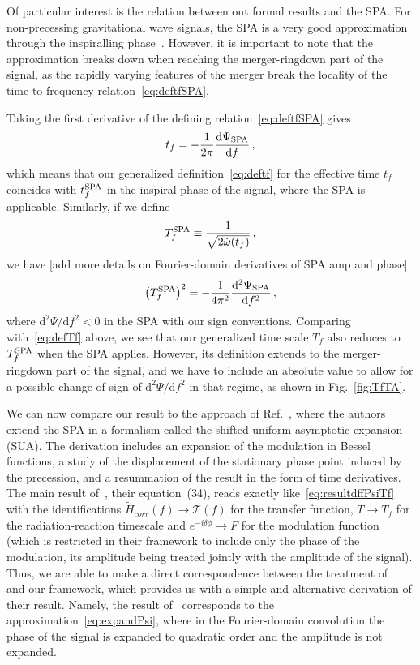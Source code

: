\documentclass[aps,showpacs,twocolumn,
prd,superscriptaddress,nofootinbib]{revtex4-1}
\newcommand{\be}{\begin{equation}}
\newcommand{\ee}{\end{equation}}
\newcommand\ud{{\mathrm{d}}}
\newcommand\calT{{\mathcal{T}}}
\newcommand{\Tf}{T_{f}}
\newcommand{\SM}[1]{{\color{Red} #1}}
\begin{document}
Of particular interest is the relation between out formal results and the SPA. For non-precessing gravitational wave signals, the SPA is a very good approximation through the inspiralling phase~\cite{Droz+99}. However, it is important to note that the approximation breaks down when reaching the merger-ringdown part of the signal, as the rapidly varying features of the merger break the locality of the time-to-frequency relation~\eqref{eq:deftfSPA}.  

Taking the first derivative of the defining relation~\eqref{eq:deftfSPA} gives
\be
	t_{f} = -\frac{1}{2\pi} \frac{\ud \Psi_{\rm SPA}}{\ud f} \,,
\ee
which means that our generalized definition~\eqref{eq:deftf} for the effective time $t_{f}$ coincides with $t_{f}^{\rm SPA}$ in the inspiral phase of the signal, where the SPA is applicable. Similarly, if we define
\be
	T_{f}^{\rm SPA} \equiv \frac{1}{\sqrt{2\dot{\omega}(t_{f})}} \,,
\ee
we have \SM{[add more details on Fourier-domain derivatives of SPA amp and phase]}
\be
	\left(T_{f}^{\rm SPA} \right)^{2} = -\frac{1}{4\pi^{2}}  \frac{\ud^{2} \Psi_{\rm SPA}}{\ud f^{2}} \,,
\ee
where $\ud^{2}\Psi/\ud f^{2} < 0$ in the SPA with our sign conventions. Comparing with~\eqref{eq:defTf} above, we see that our generalized time scale $\Tf$ also reduces to $T_{f}^{\rm SPA}$ when the SPA applies. However, its definition extends to the merger-ringdown part of the signal, and we have to include an absolute value to allow for a possible change of sign of $\ud^{2}\Psi/\ud f^{2}$ in that regime, as shown in Fig.~\ref{fig:TfTA}.

We can now compare our result to the approach of Ref.~\cite{KCY14}, where the authors extend the SPA in a formalism called the shifted uniform asymptotic expansion (SUA). The derivation includes an expansion of the modulation in Bessel functions, a study of the displacement of the stationary phase point induced by the precession, and a resummation of the result in the form of time derivatives. The main result of~\cite{KCY14}, their equation~(34), reads exactly like~\eqref{eq:resultdffPsiTf} with the identifications $\tilde{H}_{corr}(f)\rightarrow \calT(f)$ for the transfer function, $T\rightarrow \Tf$ for the radiation-reaction timescale and $e^{-i\delta\phi} \rightarrow F$ for the modulation function (which is restricted in their framework to include only the phase of the modulation, its amplitude being treated jointly with the amplitude of the signal). Thus, we are able to make a direct correspondence between the treatment of~\cite{KCY14} and our framework, which provides us with a simple and alternative derivation of their result. Namely, the result of~\cite{KCY14} corresponds to the approximation~\eqref{eq:expandPsi}, where in the Fourier-domain convolution the phase of the signal is expanded to quadratic order and the amplitude is not expanded.
\end{document}
